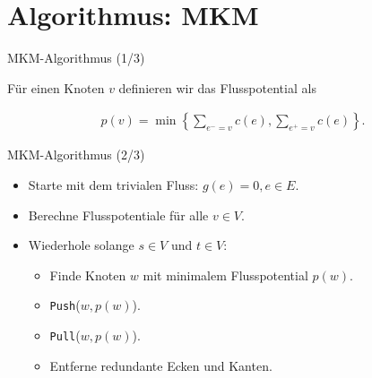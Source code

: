 \documentclass[aspectratio=169]{beamer}
\begin{document}
\section{Algorithmus: MKM}

\begin{frame}{MKM-Algorithmus (1/3)}

  \begin{definition}[Flusspotential]
    Für einen Knoten $v$ definieren wir das Flusspotential als

    \begin{align*}
      p(v) = \min \left\{ \sum_{e^- = v} c(e), \sum_{e^+ = v} c(e) \right\}. 
    \end{align*}
  \end{definition}

  
  
\end{frame}

\begin{frame}{MKM-Algorithmus (2/3)}

  \begin{algorithmus*}
    \begin{itemize}
      \item Starte mit dem trivialen Fluss: $g(e) = 0 , e \in E$.
      \item Berechne Flusspotentiale für alle $v \in V$.
      \item Wiederhole solange $s \in V$ und $t \in V$:
      \begin{itemize}
        \item Finde Knoten $w$ mit minimalem Flusspotential $p(w)$.
        \item \texttt{Push}($w,p(w)$).
        \item \texttt{Pull}($w,p(w)$).
        \item Entferne redundante Ecken und Kanten.
      \end{itemize}
    \end{itemize}
  \end{algorithmus*}
  
\end{frame}
\end{document}

